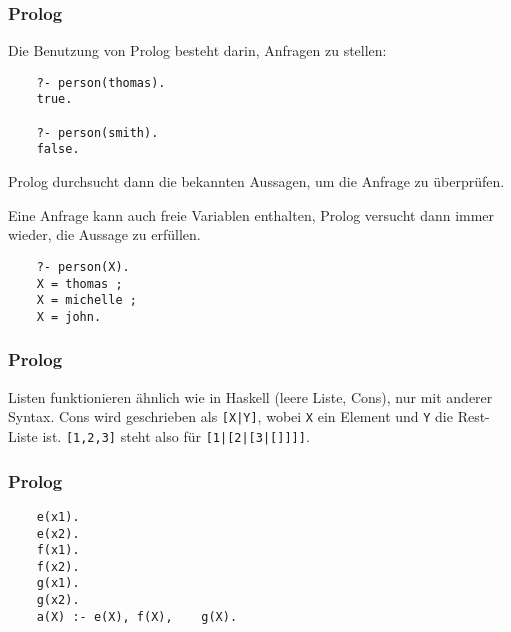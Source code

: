 \documentclass{beamer}
\begin{document}
\begin{frame}[fragile]
  \frametitle{Prolog}
  Die Benutzung von Prolog besteht darin, Anfragen zu stellen:
  \begin{lstlisting}
    ?- person(thomas).
    true.
    
    ?- person(smith).
    false.
  \end{lstlisting}
  Prolog durchsucht dann die bekannten Aussagen, um die Anfrage zu überprüfen.
  
  Eine Anfrage kann auch freie Variablen enthalten,
  Prolog versucht dann immer wieder, die Aussage zu erfüllen.
  \begin{lstlisting}
    ?- person(X).
    X = thomas ;
    X = michelle ;
    X = john.
  \end{lstlisting}
\end{frame}

\begin{frame}[fragile]
  \frametitle{Prolog}
  Listen funktionieren ähnlich wie in Haskell (leere Liste, Cons), nur mit anderer Syntax.
  Cons wird geschrieben als \lstinline{[X|Y]}, wobei \lstinline{X} ein Element und \lstinline{Y} die Rest-Liste ist.
  \lstinline{[1,2,3]} steht also für \lstinline{[1|[2|[3|[]]]]}.
\end{frame}

\begin{frame}[fragile]
  \frametitle{Prolog}
  \begin{lstlisting}
    e(x1).
    e(x2).
    f(x1).
    f(x2).
    g(x1).
    g(x2).
    a(X) :- e(X), f(X),    g(X).
  \end{lstlisting}
\end{frame}
\end{document}
